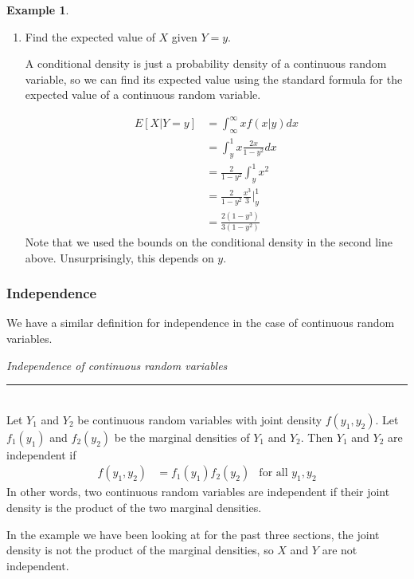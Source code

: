\documentclass[12pt]{article}
\theoremstyle{definition}
\newtheorem*{example}{Example}
\theoremstyle{remark}
\begin{document}
\begin{example}
\begin{enumerate}
\item Find the expected value of $X$ given $Y = y$.

A conditional density is just a probability density of a continuous random variable, so we can find its expected value using the standard formula for the expected value of a continuous random variable.

\begin{align*}
E[X|Y = y] &= \int_{\infty}^{\infty} xf(x|y)dx\\
&= \int_y^1 x \frac{2x}{1 - y^2} dx \\
&= \frac{2}{1 - y^2} \int_y^1 x^2 \\
&= \frac{2}{1 - y^2}\frac{x^3}{3}\Bigr|_y^1 \\
&= \frac{2(1 - y^3)}{3(1 - y^2)}
\end{align*}
Note that we used the bounds on the conditional density in the second line above. Unsurprisingly, this depends on $y$.

\end{enumerate}
\end{example}

\subsubsection{Independence}
We have a similar definition for independence in the case of continuous random variables.\\

\begin{framed}
\emph{Independence of continuous random variables}\\
  \rule{\dimexpr{}\fboxrule}{.1pt} \\
Let $Y_1$ and $Y_2$ be continuous random variables with joint density $f(y_1, y_2)$. Let $f_1(y_1)$ and $f_2(y_2)$ be the marginal densities of $Y_1$ and $Y_2$. Then $Y_1$ and $Y_2$ are independent if
\begin{align*}
f(y_1, y_2) &= f_1(y_1)f_2(y_2) & \text{for all }y_1, y_2
\end{align*}
In other words, two continuous random variables are independent if their joint density is the product of the two marginal densities.
\end{framed}

In the example we have been looking at for the past three sections, the joint density is not the product of the marginal densities, so $X$ and $Y$ are not independent.\\
\end{document}
